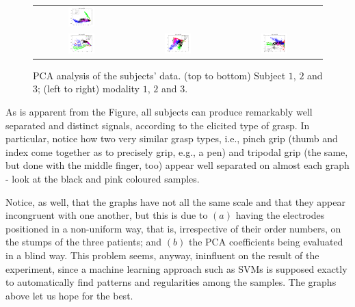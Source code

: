 \begin{figure}[!ht]
\begin{tabular}{ccc}
    \includegraphics[width=0.3\textwidth]{figs/data23} \\
    \includegraphics[width=0.3\textwidth]{figs/data31} &
    \includegraphics[width=0.3\textwidth]{figs/data32} &
    \includegraphics[width=0.3\textwidth]{figs/data33} \\
  \end{tabular}
  \caption{ PCA analysis of the subjects' data. (top to bottom)
    Subject $1$, $2$ and $3$; (left to right) modality $1$, $2$ and $3$.}
  \label{fig:PCA}
\end{figure}

As is apparent from the Figure, all subjects can produce remarkably
well separated and distinct signals, according to the elicited type of
grasp. In particular, notice how two very similar grasp types, i.e.,
pinch grip (thumb and index come together as to precisely grip, e.g.,
a pen) and tripodal grip (the same, but done with the middle finger,
too) appear well separated on almost each graph - look at the black
and pink coloured samples.

Notice, as well, that the graphs have not all the same scale and that
they appear incongruent with one another, but this is due to $(a)$
having the electrodes positioned in a non-uniform way, that is,
irrespective of their order numbers, on the stumps of the three
patients; and $(b)$ the PCA coefficients being evaluated in a blind
way. This problem seems, anyway, ininfluent on the result of the
experiment, since a machine learning approach such as SVMs is supposed
exactly to automatically find patterns and regularities among the
samples. The graphs above let us hope for the best.

